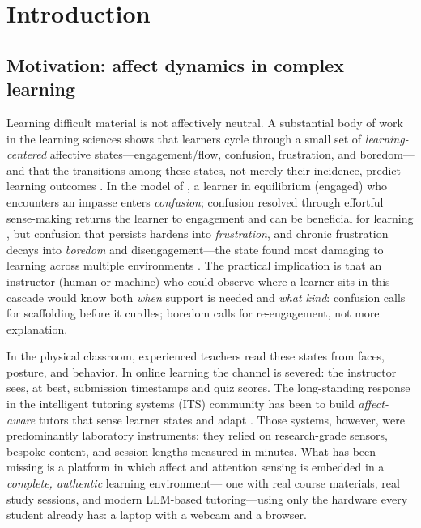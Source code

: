 \chapter{Introduction}
\label{ch:introduction}


\section{Motivation: affect dynamics in complex learning}
\label{sec:intro-motivation}

Learning difficult material is not affectively neutral. A substantial body
of work in the learning sciences shows that learners cycle through a small
set of \emph{learning-centered} affective states---engagement/flow,
confusion, frustration, and boredom---and that the transitions among these
states, not merely their incidence, predict learning outcomes
\citep{dmello2012dynamics, craig2004, baker2010better}. In the model of
\citet{dmello2012dynamics}, a learner in equilibrium (engaged) who
encounters an impasse enters \emph{confusion}; confusion resolved through
effortful sense-making returns the learner to engagement and can be
beneficial for learning \citep{dmello2014confusion}, but confusion that
persists hardens into \emph{frustration}, and chronic frustration decays
into \emph{boredom} and disengagement---the state found most damaging to
learning across multiple environments \citep{baker2010better}. The
practical implication is that an instructor (human or machine) who could
observe where a learner sits in this cascade would know both \emph{when}
support is needed and \emph{what kind}: confusion calls for scaffolding
before it curdles; boredom calls for re-engagement, not more explanation.

In the physical classroom, experienced teachers read these states from
faces, posture, and behavior. In online learning the channel is severed:
the instructor sees, at best, submission timestamps and quiz scores. The
long-standing response in the intelligent tutoring systems (ITS) community
has been to build \emph{affect-aware} tutors that sense learner states and
adapt \citep{picard1997, dmello2012affective, dmello2012gazetutor}. Those
systems, however, were predominantly laboratory instruments: they relied on
research-grade sensors, bespoke content, and session lengths measured in
minutes. What has been missing is a platform in which affect and attention
sensing is embedded in a \emph{complete, authentic} learning environment---
one with real course materials, real study sessions, and modern LLM-based
tutoring---using only the hardware every student already has: a laptop with
a webcam and a browser.

